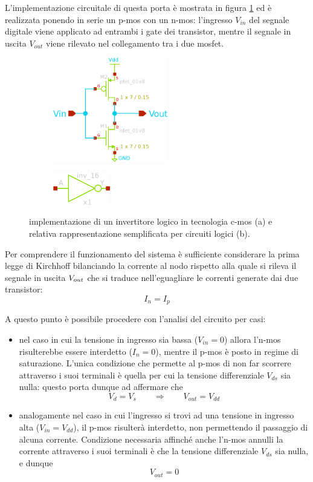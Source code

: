 	L'implementazione circuitale di questa porta è mostrata in figura \ref{fig:not:schematico} ed è realizzata ponendo in serie un p-mos con un n-mos: l'ingresso $V_{in}$ del segnale digitale viene applicato ad entrambi i gate dei transistor, mentre il segnale in uscita $V_{out}$ viene rilevato nel collegamento tra i due mosfet.
	
	\begin{figure}[bht]
		\centering
		\begin{subfigure}{0.48\linewidth}
			\centering
			\includegraphics[width=5cm]{Immagini/not-gate.eps} \caption{}			
		\end{subfigure}
		\begin{subfigure}{0.48\linewidth}
			\centering
			\includegraphics[width=2.5cm]{Immagini/not-gate-simple.eps} \caption{}			
		\end{subfigure}
		\caption{implementazione di un invertitore logico in tecnologia c-mos (a) e relativa rappresentazione semplificata per circuiti logici (b).} 
		\label{fig:not:schematico}
	\end{figure}
	
	Per comprendere il funzionamento del sistema è sufficiente considerare la prima legge di Kirchhoff bilanciando la corrente al nodo rispetto alla quale si rileva il segnale in uscita $V_{out}$ che si traduce nell'eguagliare le correnti generate dai due transistor:
	\[ I_n = I_p \]
	
	A questo punto è possibile procedere con l'analisi del circuito per casi:
	\begin{itemize}
		\item nel caso in cui la tensione in ingresso sia bassa ($V_{in} = 0$) allora l'n-mos risulterebbe essere interdetto ($I_n = 0$), mentre il p-mos è posto in regime di saturazione. L'unica condizione che permette al p-mos di non far scorrere attraverso i suoi terminali è quella per cui la tensione differenziale $V_{ds}$ sia nulla: questo porta dunque ad affermare che
		\[ V_d = V_s \qquad \Rightarrow \qquad V_{out} = V_{dd} \]
		
		\item analogamente nel caso in cui l'ingresso si trovi ad una tensione in ingresso alta ($V_{in} = V_{dd}$), il p-mos risulterà interdetto, non permettendo il passaggio di alcuna corrente. Condizione necessaria affinché anche l'n-mos annulli la corrente attraverso i suoi terminali è che la tensione differenziale $V_{ds}$ sia nulla, e dunque
		\[ V_{out} = 0 \]
	\end{itemize} 
	

